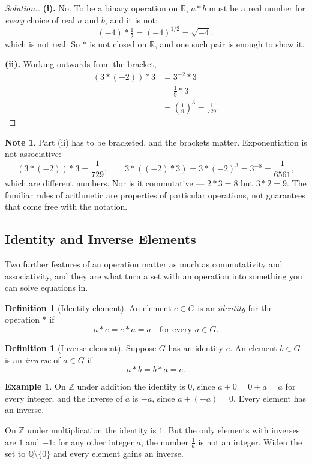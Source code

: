 \documentclass[11pt,a4paper]{article}
\theoremstyle{definition}
\newtheorem{definition}[thm]{Definition}
\newtheorem{example}[thm]{Example}
\newtheorem{note}[thm]{Note}
\newenvironment{solution}
  {\renewcommand{\qedsymbol}{}\begin{proof}[\textit{Solution}.]}
  {\end{proof}}
\begin{document}
\begin{solution}

\textbf{(i).} No. To be a binary operation on $\mathbb{R}$, $a*b$ must be a real
number for \emph{every} choice of real $a$ and $b$, and it is not:
$$(-4)*\tfrac{1}{2} = (-4)^{1/2} = \sqrt{-4},$$
which is not real. So $*$ is not closed on $\mathbb{R}$, and one such pair is
enough to show it.

\textbf{(ii).} Working outwards from the bracket,
\begin{align*}
\left(3*(-2)\right)*3 & = 3^{-2}*3\\
                      & = \frac{1}{9}*3\\
                      & = \left(\frac{1}{9}\right)^{3}
                        = \frac{1}{729} .
\end{align*}
\end{solution}

\begin{note}
Part (ii) has to be bracketed, and the brackets matter. Exponentiation is not
associative:
$$(3*(-2))*3=\frac{1}{729},\qquad 
3*((-2)*3)=3*(-2)^{3}=3^{-8}=\frac{1}{6561},$$
which are different numbers. Nor is it commutative --- $2*3=8$ but $3*2=9$. The
familiar rules of arithmetic are properties of particular operations, not
guarantees that come free with the notation.
\end{note}

\subsection{Identity and Inverse Elements}
Two further features of an operation matter as much as commutativity and
associativity, and they are what turn a set with an operation into something you
can solve equations in.

\begin{definition}[Identity element]
An element $e\in G$ is an \emph{identity} for the operation $*$ if
$$a*e=e*a=a \quad \text{for every } a\in G .$$
\end{definition}

\begin{definition}[Inverse element]
Suppose $G$ has an identity $e$. An element $b\in G$ is an \emph{inverse} of
$a\in G$ if
$$a*b=b*a=e .$$
\end{definition}

\begin{example}
On $\mathbb{Z}$ under addition the identity is $0$, since $a+0=0+a=a$ for every
integer, and the inverse of $a$ is $-a$, since $a+(-a)=0$. Every element has an
inverse.

On $\mathbb{Z}$ under multiplication the identity is $1$. But the only elements
with inverses are $1$ and $-1$: for any other integer $a$, the number $\frac{1}{a}$
is not an integer. Widen the set to $\mathbb{Q}\setminus\{0\}$ and every element
gains an inverse.
\end{example}
\end{document}
